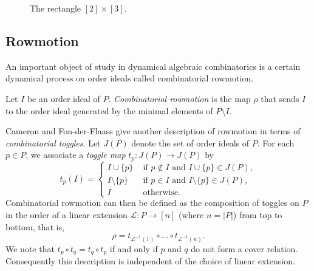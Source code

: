 \begin{figure}
\captionsetup{justification=centering}

\caption{The rectangle $[2] \times [3]$.}
 \label{squareposet}
\end{figure}

\subsection{Rowmotion}

An important object of study in dynamical algebraic combinatorics is a certain dynamical process on order ideals called combinatorial rowmotion.

\begin{Def}
Let $I$ be an order ideal of $P$. \textit{Combinatorial rowmotion} is the map $\rho$ that sends $I$ to the order ideal generated by the minimal elements of $P \setminus I$.
\end{Def}

Cameron and Fon-der-Flaass \cite{cameronfonderflaass} give another description of rowmotion in terms of \textit{combinatorial toggles}. Let $J(P)$ denote the set of order ideals of $P$. For each $p \in P$, we associate a \emph{toggle map} $t_p \colon J(P) \to J(P)$ by
\[t_p(I) = \begin{cases} I \cup \{p\} &\text{ if } p \not\in I \text{ and } I \cup \{p\} \in J(P), \\
I \setminus \{p\} &\text{ if } p \in I \text{ and } I \setminus \{p\} \in J(P), \\
I &\text{ otherwise.} \end{cases}\]
Combinatorial rowmotion can then be defined as the composition of toggles on $P$ in the order of a linear extension $\mathcal L \colon P \to [n]$ (where $n=|P|$) from top to bottom, that is,
\[\rho = t_{\mathcal{L}^{-1}(1)} \circ \dots \circ t_{\mathcal{L}^{-1}(n)}.\]
We note that $t_p \circ t_q = t_q \circ t_p$ if and only if $p$ and $q$ do not form a cover relation. Consequently this description is independent of the choice of linear extension.

